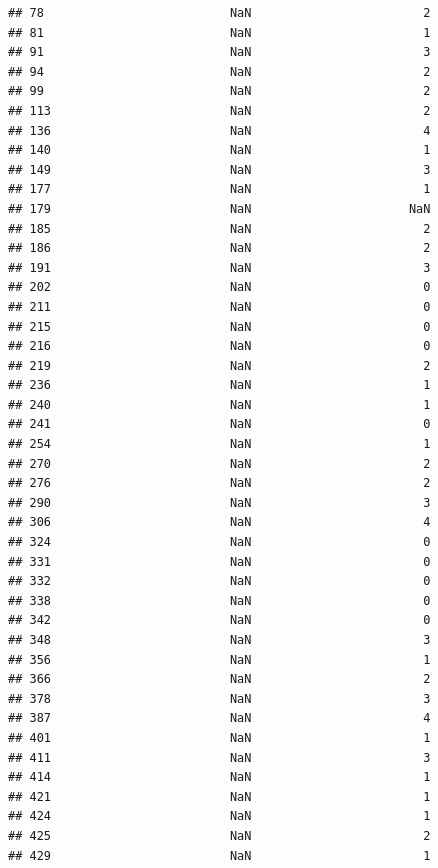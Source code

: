 \documentclass[
]{article}
\begin{document}
\begin{verbatim}
## 78                          NaN                        2
## 81                          NaN                        1
## 91                          NaN                        3
## 94                          NaN                        2
## 99                          NaN                        2
## 113                         NaN                        2
## 136                         NaN                        4
## 140                         NaN                        1
## 149                         NaN                        3
## 177                         NaN                        1
## 179                         NaN                      NaN
## 185                         NaN                        2
## 186                         NaN                        2
## 191                         NaN                        3
## 202                         NaN                        0
## 211                         NaN                        0
## 215                         NaN                        0
## 216                         NaN                        0
## 219                         NaN                        2
## 236                         NaN                        1
## 240                         NaN                        1
## 241                         NaN                        0
## 254                         NaN                        1
## 270                         NaN                        2
## 276                         NaN                        2
## 290                         NaN                        3
## 306                         NaN                        4
## 324                         NaN                        0
## 331                         NaN                        0
## 332                         NaN                        0
## 338                         NaN                        0
## 342                         NaN                        0
## 348                         NaN                        3
## 356                         NaN                        1
## 366                         NaN                        2
## 378                         NaN                        3
## 387                         NaN                        4
## 401                         NaN                        1
## 411                         NaN                        3
## 414                         NaN                        1
## 421                         NaN                        1
## 424                         NaN                        1
## 425                         NaN                        2
## 429                         NaN                        1

\end{verbatim}
\end{document}
